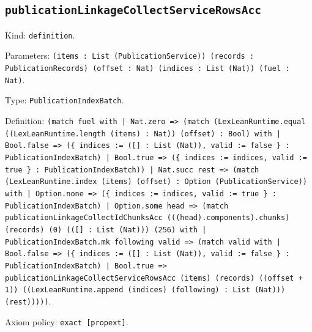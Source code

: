 \documentclass[11pt]{article}
\begin{document}
\subsection*{\texttt{publicationLinkageCollectServiceRowsAcc}}
\noindent Kind: \texttt{definition}.\par
\noindent Parameters: \texttt{(items : List (PublicationService)) (records : PublicationRecords) (offset : Nat) (indices : List (Nat)) (fuel : Nat)}.\par
\noindent Type: \texttt{PublicationIndexBatch}.\par
\noindent Definition: \texttt{(match fuel with | Nat.zero => (match (LexLeanRuntime.equal ((LexLeanRuntime.length (items) : Nat)) (offset) : Bool) with | Bool.false => (\{ indices := ([] : List (Nat)), valid := false \} : PublicationIndexBatch) | Bool.true => (\{ indices := indices, valid := true \} : PublicationIndexBatch)) | Nat.succ rest => (match (LexLeanRuntime.index (items) (offset) : Option (PublicationService)) with | Option.none => (\{ indices := indices, valid := true \} : PublicationIndexBatch) | Option.some head => (match publicationLinkageCollectIdChunksAcc (((head).components).chunks) (records) (0) (([] : List (Nat))) (256) with | PublicationIndexBatch.mk following valid => (match valid with | Bool.false => (\{ indices := ([] : List (Nat)), valid := false \} : PublicationIndexBatch) | Bool.true => publicationLinkageCollectServiceRowsAcc (items) (records) ((offset + 1)) ((LexLeanRuntime.append (indices) (following) : List (Nat))) (rest)))))}.\par
\noindent Axiom policy: \texttt{exact [propext]}.\par
\end{document}
